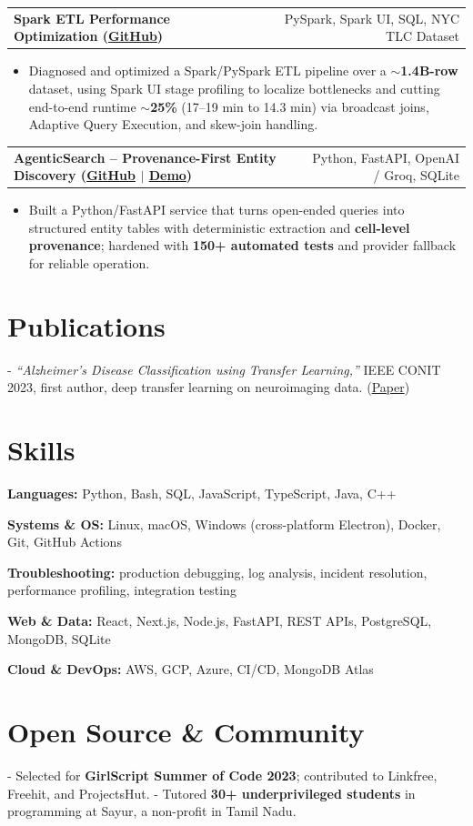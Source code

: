 \documentclass[letterpaper,11pt]{article}
\makeatletter
\newcommand{\projItem}[2]{%
  \vspace{2pt}
  \begin{tabular*}{\textwidth}{@{}l@{\extracolsep{\fill}}r@{}}
    \textbf{#1} & #2 \\
  \end{tabular*}\par\vspace{-3pt}
}
\newcommand{\skillLine}[2]{\textbf{#1:} #2\par\vspace{1.5pt}}
\newcommand{\inlineBlock}[1]{{\setlength{\leftskip}{0.18in}\small #1\par}}
\makeatother
\begin{document}
\projItem{Spark ETL Performance Optimization {\normalfont\small(\href{https://github.com/Deva-1903/Spark-ETL-Optimization}{GitHub})}}{PySpark, Spark UI, SQL, NYC TLC Dataset}
\begin{itemize}
  \item Diagnosed and optimized a Spark/PySpark ETL pipeline over a \textbf{$\sim$1.4B-row} dataset, using Spark UI stage profiling to localize bottlenecks and cutting end-to-end runtime \textbf{$\sim$25\%} (17--19 min to 14.3 min) via broadcast joins, Adaptive Query Execution, and skew-join handling.
\end{itemize}

\projItem{AgenticSearch -- Provenance-First Entity Discovery {\normalfont\small(\href{https://github.com/Deva-1903/ciir_agentic_search}{GitHub} $\vert$ \href{https://agentic-search-negglszkwa-uc.a.run.app}{Demo})}}{Python, FastAPI, OpenAI / Groq, SQLite}
\begin{itemize}
  \item Built a Python/FastAPI service that turns open-ended queries into structured entity tables with deterministic extraction and \textbf{cell-level provenance}; hardened with \textbf{150+ automated tests} and provider fallback for reliable operation.
\end{itemize}

\section{Publications}
\vspace{2pt}
\inlineBlock{- \textit{``Alzheimer's Disease Classification using Transfer Learning,''} IEEE CONIT 2023, first author, deep transfer learning on neuroimaging data. {\normalfont\small(\href{https://ieeexplore.ieee.org/document/10205760}{Paper})}}

\section{Skills}
\skillLine{Languages}{Python, Bash, SQL, JavaScript, TypeScript, Java, C++}
\skillLine{Systems \& OS}{Linux, macOS, Windows (cross-platform Electron), Docker, Git, GitHub Actions}
\skillLine{Troubleshooting}{production debugging, log analysis, incident resolution, performance profiling, integration testing}
\skillLine{Web \& Data}{React, Next.js, Node.js, FastAPI, REST APIs, PostgreSQL, MongoDB, SQLite}
\skillLine{Cloud \& DevOps}{AWS, GCP, Azure, CI/CD, MongoDB Atlas}

\section{Open Source \& Community}
\inlineBlock{- Selected for \textbf{GirlScript Summer of Code 2023}; contributed to Linkfree, Freehit, and ProjectsHut. - Tutored \textbf{30+ underprivileged students} in programming at Sayur, a non-profit in Tamil Nadu.}
\end{document}
